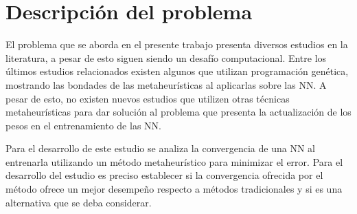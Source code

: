 \section{Descripción del problema}

El problema que se aborda en el presente trabajo presenta diversos estudios en la literatura, a pesar de esto siguen siendo un desafío computacional. Entre los últimos estudios relacionados existen algunos que utilizan programación genética, mostrando las bondades de las metaheurísticas al aplicarlas sobre las NN. A pesar de esto, no existen nuevos estudios que utilizen otras técnicas metaheurísticas para dar solución al problema que presenta la actualización de los pesos en el entrenamiento de las NN.

Para el desarrollo de este estudio se analiza la convergencia de una NN al entrenarla utilizando un método metaheurístico para minimizar el error. Para el desarrollo del estudio es preciso establecer si la convergencia ofrecida por el método ofrece un mejor desempeño respecto a métodos tradicionales y si es una alternativa que se deba considerar.




